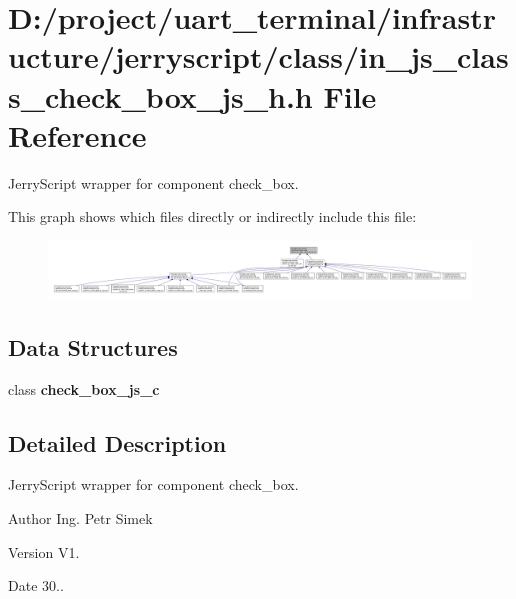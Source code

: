 \section{D\+:/project/uart\+\_\+terminal/infrastructure/jerryscript/class/in\+\_\+js\+\_\+class\+\_\+check\+\_\+box\+\_\+js\+\_\+h.h File Reference}
\label{in__js__class__check__box__js__h_8h}


Jerry\+Script wrapper for component check\+\_\+box.  


This graph shows which files directly or indirectly include this file\+:\nopagebreak
\begin{figure}[H]
\begin{center}
\leavevmode
\includegraphics[width=350pt]{in__js__class__check__box__js__h_8h__dep__incl}
\end{center}
\end{figure}
\subsection*{Data Structures}
\begin{DoxyCompactItemize}
\item 
class \textbf{ check\+\_\+box\+\_\+js\+\_\+c}
\end{DoxyCompactItemize}


\subsection{Detailed Description}
Jerry\+Script wrapper for component check\+\_\+box. 

\begin{DoxyAuthor}{Author}
Ing. Petr Simek 
\end{DoxyAuthor}
\begin{DoxyVersion}{Version}
V1. 
\end{DoxyVersion}
\begin{DoxyDate}{Date}
30.. 
\end{DoxyDate}
